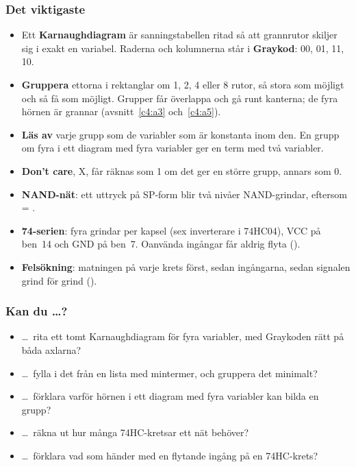 \subsubsection{Det viktigaste}
\begin{itemize}
  \item Ett \textbf{Karnaughdiagram} är sanningstabellen ritad så att grannrutor skiljer sig i
    exakt en variabel. Raderna och kolumnerna står i \textbf{Graykod}: 00, 01, 11, 10.
  \item \textbf{Gruppera} ettorna i rektanglar om 1, 2, 4 eller 8 rutor, så stora som möjligt och så
    få som möjligt. Grupper får överlappa och gå runt kanterna; de fyra hörnen är grannar
    (avsnitt~\ref{c4:a3} och~\ref{c4:a5}).
  \item \textbf{Läs av} varje grupp som de variabler som är konstanta inom den. En grupp om fyra i
    ett diagram med fyra variabler ger en term med två variabler.
  \item \textbf{Don't care}, X, får räknas som 1 om det ger en större grupp, annars som 0.
  \item \textbf{NAND-nät}: ett uttryck på SP-form blir två nivåer NAND-grindar, eftersom
     = .
  \item \textbf{74-serien}: fyra grindar per kapsel (sex inverterare i 74HC04), VCC på ben~14 och
    GND på ben~7. Oanvända ingångar får aldrig flyta ().
  \item \textbf{Felsökning}: matningen på varje krets först, sedan ingångarna, sedan signalen grind
    för grind ().
\end{itemize}

\subsubsection{Kan du \dots?}
\begin{itemize}
  \item \dots\ rita ett tomt Karnaughdiagram för fyra variabler, med Graykoden rätt på båda
    axlarna?
  \item \dots\ fylla i det från en lista med mintermer, och gruppera det minimalt?
  \item \dots\ förklara varför hörnen i ett diagram med fyra variabler kan bilda en grupp?
  \item \dots\ räkna ut hur många 74HC-kretsar ett nät behöver?
  \item \dots\ förklara vad som händer med en flytande ingång på en 74HC-krets?
\end{itemize}

